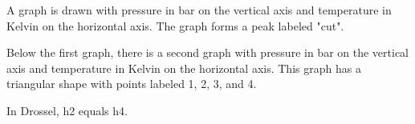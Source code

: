 A graph is drawn with pressure in bar on the vertical axis and temperature in Kelvin on the horizontal axis. The graph forms a peak labeled "cut".

Below the first graph, there is a second graph with pressure in bar on the vertical axis and temperature in Kelvin on the horizontal axis. This graph has a triangular shape with points labeled 1, 2, 3, and 4.

In Drossel, h2 equals h4.
